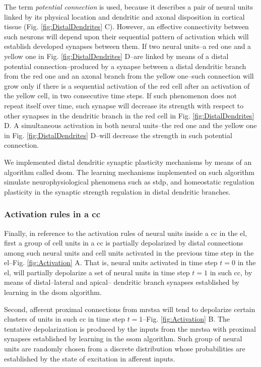 \documentclass[11pt,a4paper]{article}
\begin{document}
The term \emph{potential connection} is used, because it describes a pair of neural units linked by its physical location and dendritic and axonal disposition in cortical tissue (Fig. \ref{fig:DistalDendrites} C). However, an effective connectivity between such neurons will depend upon their sequential pattern of activation which will establish developed synapses between them. If two neural units--a red one and a yellow one in Fig. \ref{fig:DistalDendrites} D--are linked by means of a distal potential connection--produced by a synapse between a distal dendritic branch from the red one and an axonal branch from the yellow one--such connection will grow only if there is a sequential activation of the red cell after an activation of the yellow cell, in two consecutive time steps. If such phenomenon does not repeat itself over time, such synapse will decrease its strength with respect to other synapses in the dendritic branch in the red cell in Fig. \ref{fig:DistalDendrites} D. A simultaneous activation in both neural units--the red one and the yellow one in Fig. \ref{fig:DistalDendrites} D--will decrease the strength in such potential connection.

We implemented distal dendritic synaptic plasticity mechanisms by means of an algorithm called \gls{dsom}.
The learning mechanisms implemented on such algorithm simulate neurophysiological phenomena
such as \gls{stdp}, and homeostatic regulation plasticity in the synaptic strength regulation in
distal dendritic branches.







\subsubsection*{Activation rules in a \gls{cc}}

Finally, in reference to the activation rules of neural units inside a \gls{cc} in the \gls{el},
first a group of cell units in a \gls{cc} is partially depolarized 
by distal connections among such neural units and cell units activated in the
previous time step in the \gls{el}--Fig. \ref{fig:Activation} A.
That is, neural units activated in time step $t=0$ in the \gls{el}, will partially depolarize
a set of neural units in time step $t=1$ in such \gls{cc}, by means of distal--lateral and apical--
dendritic branch synapses established by learning in the \gls{dsom} algorithm.

Second, afferent proximal connections from \gls{mrstsa} will tend to depolarize
certain clusters of units in such \gls{cc} in time step $t=1$--Fig. \ref{fig:Activation} B.
The tentative depolarization is produced by the inputs from the \gls{mrstsa} with
proximal synapses established by learning in the \gls{ssom} algorithm. 
Such group of neural units are randomly chosen from a discrete distribution
whose probabilities are established by the state of excitation in afferent inputs.
\end{document}
